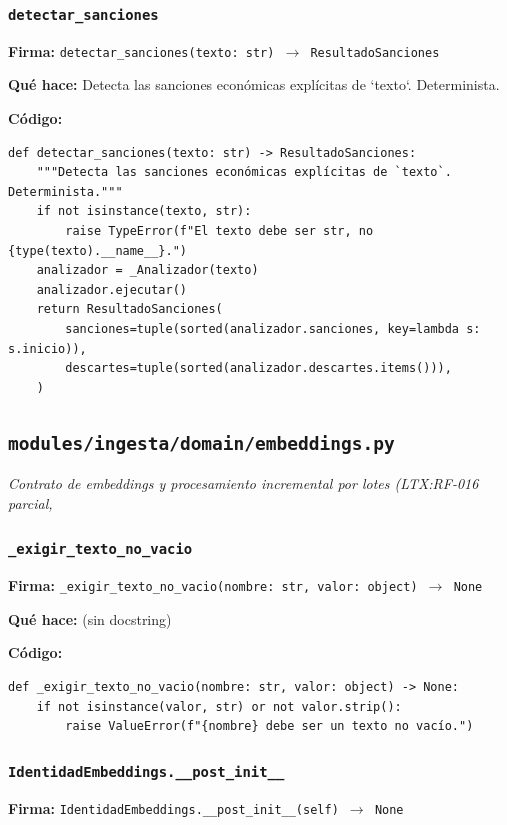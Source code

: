\documentclass[11pt,a4paper]{article}
\begin{document}
\subsubsection*{\texttt{detectar\_sanciones}}
\textbf{Firma:} \texttt{detectar\_sanciones(texto: str) $\rightarrow$ ResultadoSanciones}

\textbf{Qué hace:} Detecta las sanciones económicas explícitas de `texto`. Determinista.

\textbf{Código:}
\begin{lstlisting}
def detectar_sanciones(texto: str) -> ResultadoSanciones:
    """Detecta las sanciones económicas explícitas de `texto`. Determinista."""
    if not isinstance(texto, str):
        raise TypeError(f"El texto debe ser str, no {type(texto).__name__}.")
    analizador = _Analizador(texto)
    analizador.ejecutar()
    return ResultadoSanciones(
        sanciones=tuple(sorted(analizador.sanciones, key=lambda s: s.inicio)),
        descartes=tuple(sorted(analizador.descartes.items())),
    )
\end{lstlisting}

\subsection{\texttt{modules/ingesta/domain/embeddings.py}}
\textit{Contrato de embeddings y procesamiento incremental por lotes (LTX:RF-016 parcial,}

\subsubsection*{\texttt{\_exigir\_texto\_no\_vacio}}
\textbf{Firma:} \texttt{\_exigir\_texto\_no\_vacio(nombre: str, valor: object) $\rightarrow$ None}

\textbf{Qué hace:} (sin docstring)

\textbf{Código:}
\begin{lstlisting}
def _exigir_texto_no_vacio(nombre: str, valor: object) -> None:
    if not isinstance(valor, str) or not valor.strip():
        raise ValueError(f"{nombre} debe ser un texto no vacío.")
\end{lstlisting}

\subsubsection*{\texttt{IdentidadEmbeddings.\_\_post\_init\_\_}}
\textbf{Firma:} \texttt{IdentidadEmbeddings.\_\_post\_init\_\_(self) $\rightarrow$ None}
\end{document}
